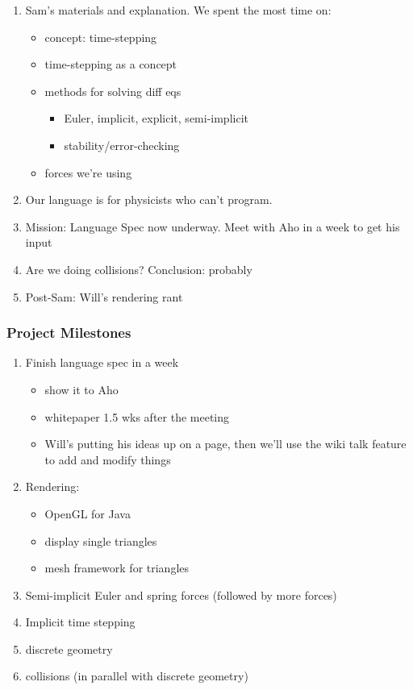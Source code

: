 \begin{enumerate}
\item Sam's materials and explanation. We spent the most time on:
  \begin{itemize}
  \item concept: time-stepping
  \item time-stepping as a concept
  \item methods for solving diff eqs
    \begin{itemize}
    \item Euler, implicit, explicit, semi-implicit
    \item stability/error-checking
    \end{itemize}
  \item forces we're using
  \end{itemize}

\item Our language is for physicists who can't program.
\item Mission: Language Spec now underway. Meet with Aho in a week to
  get his input

\item Are we doing collisions? Conclusion: probably
\item Post-Sam: Will's rendering rant
\end{enumerate}


\subsubsection*{Project Milestones}
\begin{enumerate}
\item Finish language spec in a week
  \begin{itemize}
  \item show it to Aho
  \item whitepaper 1.5 wks after the meeting
  \item Will's putting his ideas up on a page, then we'll use the wiki
    talk feature to add and modify things
  \end{itemize}

\item Rendering:
  \begin{itemize}
  \item OpenGL for Java
  \item display single triangles
  \item mesh framework for triangles
  \end{itemize}

\item Semi-implicit Euler and spring forces (followed by more forces)
\item Implicit time stepping
\item discrete geometry
\item collisions (in parallel with discrete geometry)
\end{enumerate}

